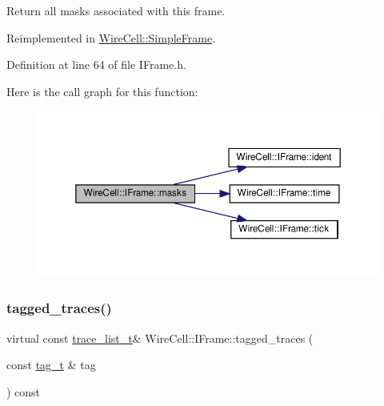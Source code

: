 Return all masks associated with this frame. 



Reimplemented in \hyperlink{class_wire_cell_1_1_simple_frame_a9261256f0f814b50120d6eabe2a13f0d}{Wire\+Cell\+::\+Simple\+Frame}.



Definition at line 64 of file I\+Frame.\+h.

Here is the call graph for this function\+:
\nopagebreak
\begin{figure}[H]
\begin{center}
\leavevmode
\includegraphics[width=350pt]{class_wire_cell_1_1_i_frame_a577dd9839b5239799ee8c8e508b3a9e4_cgraph}
\end{center}
\end{figure}
\mbox{\label{class_wire_cell_1_1_i_frame_ae5d922a082d23583c7b6dff24c1116ed}} 
\subsubsection{\texorpdfstring{tagged\+\_\+traces()}{tagged\_traces()}}
{\footnotesize\ttfamily virtual const \hyperlink{class_wire_cell_1_1_i_frame_a12f08adf79d21cb9b4862a16193fda8f}{trace\+\_\+list\+\_\+t}\& Wire\+Cell\+::\+I\+Frame\+::tagged\+\_\+traces (\begin{DoxyParamCaption}\item[{const \hyperlink{class_wire_cell_1_1_i_frame_ae206ba618e10f398625dfeb675a4215a}{tag\+\_\+t} \&}]{tag }\end{DoxyParamCaption}) const\hspace{0.3cm}{\ttfamily [pure virtual]}}



